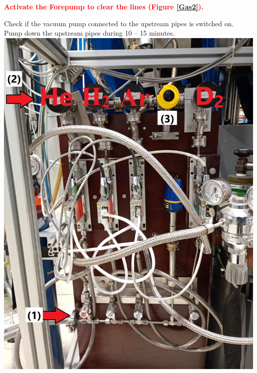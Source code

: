 \documentclass[fleqn,a4paper,20pt]{article}
\begin{document}
\textcolor{red}{\textbf{Activate the Forepump to clear the lines (Figure \ref{Gas2}).}}\\


\begin{minipage}{.3\textwidth}
	
{Check if the vacuum pump connected to the upstream pipes is switched on. Pump down the upstream pipes during 10 – 15 minutes. }\\

{
	\includegraphics[width=\linewidth]{Gas1}
	\label{Gas1}}
\end{minipage}
\begin{minipage}{.02\textwidth}
	$\ $\\
\end{minipage}
\end{document}
